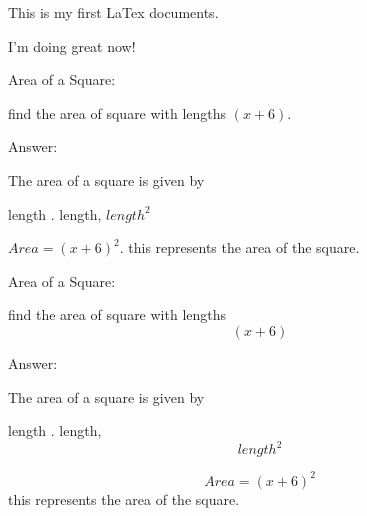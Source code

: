 \documentclass[11pt]{article}
\begin{document}
This is my first LaTex documents.

I'm doing great now!

Area of a Square:

find the area of square with lengths $(x+6)$.

Answer:

The area of a square is given by


length $.$ length, $length^2$

$Area = (x+6)^2$. this represents the area of the square.


Area of a Square:

find the area of square with lengths $$(x+6)$$

Answer:

The area of a square is given by


length $.$ length, $$length^2$$

$$Area = (x+6)^2$$this represents the area of the square.
\end{document}
